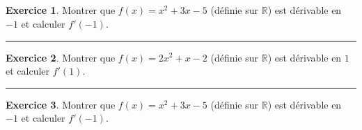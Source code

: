 \documentclass{exam}
\title{\Document\ \Titre \Type}
\theoremstyle{definition}
\newtheorem{exercice}{Exercice}
\begin{document}
\large


\begin{exercice}
    Montrer que $f(x) = x^2 + 3x - 5$ (définie sur $\mathbb{R}$) est dérivable en $-1$ et calculer $f'(-1)$.
    \begin{center}
        \framebox[1\textwidth]{\parbox{5.5in}{
        \vspace{10em}}}
    \end{center}
\end{exercice}

\hrule

\vspace{1em}
\setcounter{exercice}{0}


\begin{exercice}
    Montrer que $f(x) = 2x^2 + x - 2$ (définie sur $\mathbb{R}$) est dérivable en $1$ et calculer $f'(1)$.
    \begin{center}
        \framebox[1\textwidth]{\parbox{5.5in}{
        \vspace{10em}}}
    \end{center}
\end{exercice}

\hrule

\vspace{1em}
\setcounter{exercice}{0}


\begin{exercice}
    Montrer que $f(x) = x^2 + 3x - 5$ (définie sur $\mathbb{R}$) est dérivable en $-1$ et calculer $f'(-1)$.
    \begin{center}
        \framebox[1\textwidth]{\parbox{5.5in}{
        \vspace{10em}}}
    \end{center}
\end{exercice}
\end{document}
